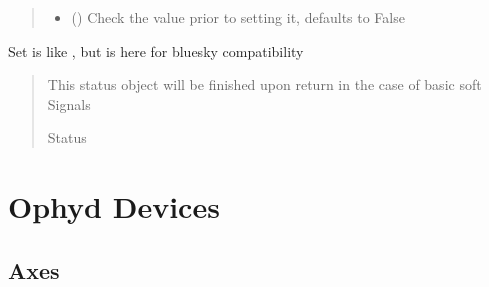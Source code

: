 \documentclass[letterpaper,10pt,english]{sphinxmanual}
\begin{document}
\begin{fulllineitems}
\begin{fulllineitems}
\begin{quote}
\begin{description}
\begin{itemize}
\item {} 
\sphinxAtStartPar
{} (\sphinxstyleliteralemphasis{\sphinxupquote{, }}) \textendash{} Check the value prior to setting it, defaults to False

\end{itemize}

\end{description}\end{quote}

\end{fulllineitems}


\begin{fulllineitems}
\label{\detokenize{API:raypyng_bluesky.signal.RayPySignalRO.set}}
\pysigstartsignatures
{}
\pysigstopsignatures
\sphinxAtStartPar
Set is like , but is here for bluesky compatibility
\begin{quote}\begin{description}
\sphinxAtStartPar
{} \textendash{} This status object will be finished upon return in the
case of basic soft Signals

\sphinxAtStartPar
Status

\end{description}\end{quote}

\end{fulllineitems}


\end{fulllineitems}



\section{Ophyd Devices}
\label{\detokenize{API:ophyd-devices}}

\subsection{Axes}
\label{\detokenize{API:axes}}
\end{document}
